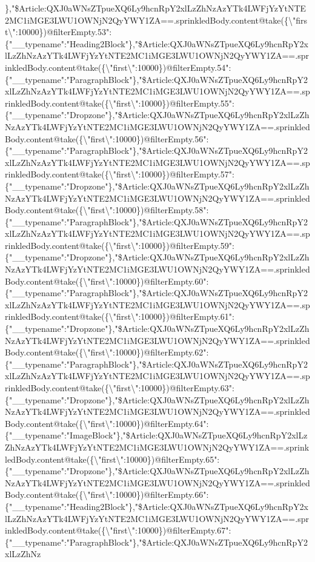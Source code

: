\},"\$Article:QXJ0aWNsZTpueXQ6Ly9hcnRpY2xlLzZhNzAzYTk4LWFjYzYtNTE2MC1iMGE3LWU1OWNjN2QyYWY1ZA==.sprinkledBody.content@take(\{\textbackslash{}"first\textbackslash{}":10000\})@filterEmpty.53":\{"\_\_typename":"Heading2Block"\},"\$Article:QXJ0aWNsZTpueXQ6Ly9hcnRpY2xlLzZhNzAzYTk4LWFjYzYtNTE2MC1iMGE3LWU1OWNjN2QyYWY1ZA==.sprinkledBody.content@take(\{\textbackslash{}"first\textbackslash{}":10000\})@filterEmpty.54":\{"\_\_typename":"ParagraphBlock"\},"\$Article:QXJ0aWNsZTpueXQ6Ly9hcnRpY2xlLzZhNzAzYTk4LWFjYzYtNTE2MC1iMGE3LWU1OWNjN2QyYWY1ZA==.sprinkledBody.content@take(\{\textbackslash{}"first\textbackslash{}":10000\})@filterEmpty.55":\{"\_\_typename":"Dropzone"\},"\$Article:QXJ0aWNsZTpueXQ6Ly9hcnRpY2xlLzZhNzAzYTk4LWFjYzYtNTE2MC1iMGE3LWU1OWNjN2QyYWY1ZA==.sprinkledBody.content@take(\{\textbackslash{}"first\textbackslash{}":10000\})@filterEmpty.56":\{"\_\_typename":"ParagraphBlock"\},"\$Article:QXJ0aWNsZTpueXQ6Ly9hcnRpY2xlLzZhNzAzYTk4LWFjYzYtNTE2MC1iMGE3LWU1OWNjN2QyYWY1ZA==.sprinkledBody.content@take(\{\textbackslash{}"first\textbackslash{}":10000\})@filterEmpty.57":\{"\_\_typename":"Dropzone"\},"\$Article:QXJ0aWNsZTpueXQ6Ly9hcnRpY2xlLzZhNzAzYTk4LWFjYzYtNTE2MC1iMGE3LWU1OWNjN2QyYWY1ZA==.sprinkledBody.content@take(\{\textbackslash{}"first\textbackslash{}":10000\})@filterEmpty.58":\{"\_\_typename":"ParagraphBlock"\},"\$Article:QXJ0aWNsZTpueXQ6Ly9hcnRpY2xlLzZhNzAzYTk4LWFjYzYtNTE2MC1iMGE3LWU1OWNjN2QyYWY1ZA==.sprinkledBody.content@take(\{\textbackslash{}"first\textbackslash{}":10000\})@filterEmpty.59":\{"\_\_typename":"Dropzone"\},"\$Article:QXJ0aWNsZTpueXQ6Ly9hcnRpY2xlLzZhNzAzYTk4LWFjYzYtNTE2MC1iMGE3LWU1OWNjN2QyYWY1ZA==.sprinkledBody.content@take(\{\textbackslash{}"first\textbackslash{}":10000\})@filterEmpty.60":\{"\_\_typename":"ParagraphBlock"\},"\$Article:QXJ0aWNsZTpueXQ6Ly9hcnRpY2xlLzZhNzAzYTk4LWFjYzYtNTE2MC1iMGE3LWU1OWNjN2QyYWY1ZA==.sprinkledBody.content@take(\{\textbackslash{}"first\textbackslash{}":10000\})@filterEmpty.61":\{"\_\_typename":"Dropzone"\},"\$Article:QXJ0aWNsZTpueXQ6Ly9hcnRpY2xlLzZhNzAzYTk4LWFjYzYtNTE2MC1iMGE3LWU1OWNjN2QyYWY1ZA==.sprinkledBody.content@take(\{\textbackslash{}"first\textbackslash{}":10000\})@filterEmpty.62":\{"\_\_typename":"ParagraphBlock"\},"\$Article:QXJ0aWNsZTpueXQ6Ly9hcnRpY2xlLzZhNzAzYTk4LWFjYzYtNTE2MC1iMGE3LWU1OWNjN2QyYWY1ZA==.sprinkledBody.content@take(\{\textbackslash{}"first\textbackslash{}":10000\})@filterEmpty.63":\{"\_\_typename":"Dropzone"\},"\$Article:QXJ0aWNsZTpueXQ6Ly9hcnRpY2xlLzZhNzAzYTk4LWFjYzYtNTE2MC1iMGE3LWU1OWNjN2QyYWY1ZA==.sprinkledBody.content@take(\{\textbackslash{}"first\textbackslash{}":10000\})@filterEmpty.64":\{"\_\_typename":"ImageBlock"\},"\$Article:QXJ0aWNsZTpueXQ6Ly9hcnRpY2xlLzZhNzAzYTk4LWFjYzYtNTE2MC1iMGE3LWU1OWNjN2QyYWY1ZA==.sprinkledBody.content@take(\{\textbackslash{}"first\textbackslash{}":10000\})@filterEmpty.65":\{"\_\_typename":"Dropzone"\},"\$Article:QXJ0aWNsZTpueXQ6Ly9hcnRpY2xlLzZhNzAzYTk4LWFjYzYtNTE2MC1iMGE3LWU1OWNjN2QyYWY1ZA==.sprinkledBody.content@take(\{\textbackslash{}"first\textbackslash{}":10000\})@filterEmpty.66":\{"\_\_typename":"Heading2Block"\},"\$Article:QXJ0aWNsZTpueXQ6Ly9hcnRpY2xlLzZhNzAzYTk4LWFjYzYtNTE2MC1iMGE3LWU1OWNjN2QyYWY1ZA==.sprinkledBody.content@take(\{\textbackslash{}"first\textbackslash{}":10000\})@filterEmpty.67":\{"\_\_typename":"ParagraphBlock"\},"\$Article:QXJ0aWNsZTpueXQ6Ly9hcnRpY2xlLzZhNz